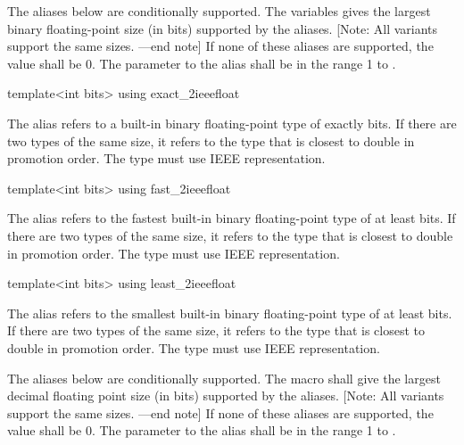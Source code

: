 \begin{addedblock}
The aliases below are conditionally supported. The  variables gives the largest binary floating-point size (in bits) supported by the aliases. [Note: All variants support the same sizes. —end note] If none of these aliases are supported, the value shall be 0. The parameter to the alias shall be in the range 1 to .

\begin{itemdecl}
template<int bits> using exact_2ieeefloat
\end{itemdecl}

\begin{itemdescr}
The alias  refers to a built-in binary floating-point type of exactly  bits. If there are two types of the same size, it refers to the type that is closest to double in promotion order. The type must use IEEE representation.
\end{itemdescr}

\begin{itemdecl}
template<int bits> using fast_2ieeefloat
\end{itemdecl}

\begin{itemdescr}
The alias  refers to the fastest built-in binary floating-point type of at least  bits. If there are two types of the same size, it refers to the type that is closest to double in promotion order. The type must use IEEE representation.
\end{itemdescr}

\begin{itemdecl}
template<int bits> using least_2ieeefloat
\end{itemdecl}

\begin{itemdescr}
The alias  refers to the smallest built-in binary floating-point type of at least  bits. If there are two types of the same size, it refers to the type that is closest to double in promotion order. The type must use IEEE representation.
\end{itemdescr}

The aliases below are conditionally supported. The macro  shall give the largest decimal floating point size (in bits) supported by the aliases. [Note: All variants support the same sizes. —end note] If none of these aliases are supported, the value shall be 0. The parameter to the alias shall be in the range 1 to .


\end{addedblock}
